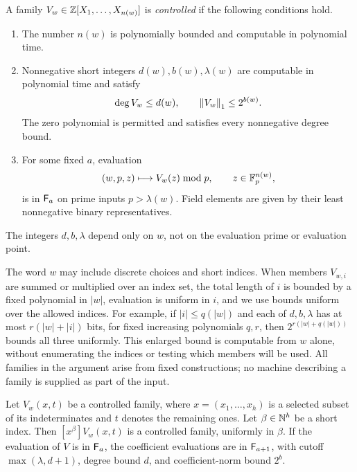 \begin{definition}\label{def:controlled}
A family $V_w\in\mathbb Z[X_1,\ldots,X_{n(w)}]$ is \emph{controlled} if the
following conditions hold.
\begin{enumerate}
\item The number $n(w)$ is polynomially bounded and computable in
polynomial time.
\item Nonnegative short integers $d(w),b(w),\lambda(w)$ are computable
in polynomial time and satisfy
\[
 \deg V_w\le d(w),\qquad \left\lVert V_w\right\rVert_1\le2^{b(w)}.
\]
The zero polynomial is permitted and satisfies every nonnegative degree
bound.
\item For some fixed $a$, evaluation
\[
 (w,p,z)\longmapsto V_w(z)\bmod p,
 \qquad z\in\mathbb F_p^{n(w)},
\]
is in $\mathsf F_{a}$ on prime inputs $p>\lambda(w)$.  Field elements are
given by their least nonnegative binary representatives.
\end{enumerate}
The integers $d,b,\lambda$ depend only on $w$, not on the evaluation
prime or evaluation point.
\end{definition}

The word $w$ may include discrete choices and short indices.  When
members $V_{w,i}$ are summed or multiplied over an index set, the total
length of $i$ is bounded by a fixed polynomial in $|w|$, evaluation is
uniform in $i$, and we use bounds uniform over the allowed indices.
For example, if $|i|\le q(|w|)$ and each of $d,b,\lambda$ has at most
$r(|w|+|i|)$ bits, for fixed increasing polynomials $q,r$, then
$2^{r(|w|+q(|w|))}$ bounds all three uniformly.  This enlarged bound is
computable from $w$ alone, without enumerating the indices or testing
which members will be used.  All families in the argument arise from
fixed constructions; no machine describing a family is supplied as part
of the input.

\begin{lemma}\label{lem:field-coefficient}
Let $V_w(x,t)$ be a controlled family, where $x=(x_1,\ldots,x_h)$ is a
selected subset of its indeterminates and $t$ denotes the remaining
ones.  Let $\beta\in\mathbb N^h$ be a short index.  Then
$[x^\beta]V_w(x,t)$ is a controlled family, uniformly in $\beta$.
If the evaluation of $V$ is in $\mathsf F_{a}$, the coefficient evaluations
are in $\mathsf F_{a+1}$, with cutoff $\max(\lambda,d+1)$, degree bound
$d$, and coefficient-norm bound $2^b$.
\end{lemma}

